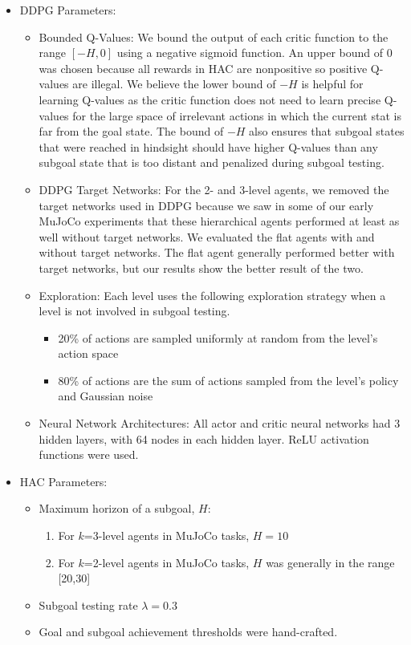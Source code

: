 \documentclass{article} %
\begin{document}
\begin{itemize}
    \item DDPG Parameters:
    \begin{itemize}
        \item Bounded Q-Values: We bound the output of each critic function to the range $[-H,0]$ using a negative sigmoid function.  An upper bound of 0 was chosen because all rewards in HAC are nonpositive so positive Q-values are illegal.  We believe the lower bound of $-H$ is helpful for learning Q-values as the critic function does not need to learn precise Q-values for the large space of irrelevant actions in which the current stat is far from the goal state.  The bound of $-H$ also ensures that subgoal states that were reached in hindsight should have higher Q-values than any subgoal state that is too distant and penalized during subgoal testing.
        \item DDPG Target Networks: For the 2- and 3-level agents, we removed the target networks used in DDPG because we saw in some of our early MuJoCo experiments that these hierarchical agents performed at least as well without target networks.  We evaluated the flat agents with and without target networks.  The flat agent generally performed better with target networks, but our results show the better result of the two.
        \item Exploration: Each level uses the following exploration strategy when a level is not involved in subgoal testing.  
            \begin{itemize}
                \item 20\% of actions are sampled uniformly at random from the level's action space
                \item 80\% of actions are the sum of actions sampled from the level's policy and Gaussian noise 
            \end{itemize}
        \item Neural Network Architectures: All actor and critic neural networks had 3 hidden layers, with 64 nodes in each hidden layer.  ReLU activation functions were used.
    \end{itemize}
    \item HAC Parameters:
    \begin{itemize}
        \item Maximum horizon of a subgoal, $H$:
            \begin{enumerate}
                \item For $k$=3-level agents in MuJoCo tasks, $H=10$
                \item For $k$=2-level agents in MuJoCo tasks, $H$ was generally in the range [20,30] 
            \end{enumerate}
        \item Subgoal testing rate $\lambda = 0.3$
        \item Goal and subgoal achievement thresholds were hand-crafted.
    \end{itemize}
    
\end{itemize}
\end{document}
